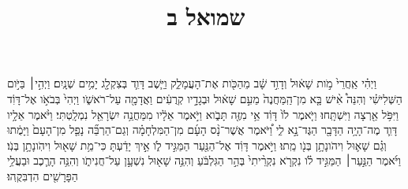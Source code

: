 \documentclass{openreader}
\title{שמואל ב}
\date{}
\begin{document}
\maketitle
\raggedbottom 
\fontsize{16pt}{24pt}\selectfont


וַיְהִ֗י אַֽחֲרֵי֙ מֹ֣ות שָׁא֔וּל וְדָוִ֣ד שָׁ֔ב מֵהַכֹּ֖ות אֶת־הָעֲמָלֵ֑ק וַיֵּ֧שֶׁב דָּוִ֛ד בְּצִקְלָ֖ג יָמִ֥ים שְׁנָֽיִם׃ 
וַיְהִ֣י׀ בַּיֹּ֣ום הַשְּׁלִישִׁ֗י וְהִנֵּה֩ אִ֨ישׁ בָּ֤א מִן־הַֽמַּחֲנֶה֙ מֵעִ֣ם שָׁא֔וּל וּבְגָדָ֣יו קְרֻעִ֔ים וַאֲדָמָ֖ה עַל־רֹאשֹׁ֑ו וַיְהִי֙ בְּבֹאֹ֣ו אֶל־דָּוִ֔ד וַיִּפֹּ֥ל אַ֖רְצָה וַיִּשְׁתָּֽחוּ׃ 
וַיֹּ֤אמֶר לֹו֙ דָּוִ֔ד אֵ֥י מִזֶּ֖ה תָּבֹ֑וא וַיֹּ֣אמֶר אֵלָ֔יו מִמַּחֲנֵ֥ה יִשְׂרָאֵ֖ל נִמְלָֽטְתִּי׃ 
וַיֹּ֨אמֶר אֵלָ֥יו דָּוִ֛ד מֶה־הָיָ֥ה הַדָּבָ֖ר הַגֶּד־נָ֣א לִ֑י וַ֠יֹּאמֶר אֲשֶׁר־נָ֨ס הָעָ֜ם מִן־הַמִּלְחָמָ֗ה וְגַם־הַרְבֵּ֞ה נָפַ֤ל מִן־הָעָם֙ וַיָּמֻ֔תוּ וְגַ֗ם שָׁא֛וּל וִיהֹונָתָ֥ן בְּנֹ֖ו מֵֽתוּ׃ 
וַיֹּ֣אמֶר דָּוִ֔ד אֶל־הַנַּ֖עַר הַמַּגִּ֣יד לֹ֑ו אֵ֣יךְ יָדַ֔עְתָּ כִּי־מֵ֥ת שָׁא֖וּל וִיהֹֽונָתָ֥ן בְּנֹֽו׃ 
וַיֹּ֜אמֶר הַנַּ֣עַר׀ הַמַּגִּ֣יד לֹ֗ו נִקְרֹ֤א נִקְרֵ֨יתִי֙ בְּהַ֣ר הַגִּלְבֹּ֔עַ וְהִנֵּ֥ה שָׁא֖וּל נִשְׁעָ֣ן עַל־חֲנִיתֹ֑ו וְהִנֵּ֥ה הָרֶ֛כֶב וּבַעֲלֵ֥י הַפָּרָשִׁ֖ים הִדְבִּקֻֽהוּ׃ 
\end{document}
